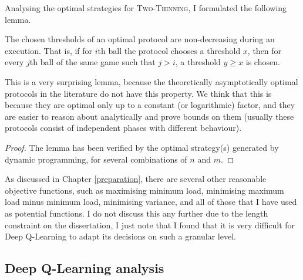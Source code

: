 


Analysing the optimal strategies for \textsc{Two-Thinning}, I formulated the following lemma.

\begin{lemma}\label{lemma: two-thinning-increasing-threshold}
The chosen thresholds of an optimal protocol are non-decreasing during an execution. That is, if for $i$th ball the protocol chooses a threshold $x$, then for every $j$th ball of the same game such that $j>i$, a threshold $y\geq x$ is chosen.
\end{lemma}




This is a very surprising lemma, because the theoretically asymptotically optimal protocols in the literature do not have this property. We think that this is because they are optimal only up to a constant (or logarithmic) factor, and they are easier to reason about analytically and prove bounds on them (usually these protocols consist of independent phases with different behaviour).


\begin{proof}


The lemma has been verified by the optimal strategy(s) generated by dynamic programming, for several combinations of $n$ and $m$. 
\end{proof}


As discussed in Chapter \ref{preparation}, there are several other reasonable objective functions, such as maximising minimum load, minimising maximum load minus minimum load, minimising variance, and all of those that I have used as potential functions. I do not discuss this any further due to the length constraint on the dissertation, I just note that I found that it is very difficult for Deep Q-Learning to adapt its decisions on such a granular level. 


\subsection{Deep Q-Learning analysis}



